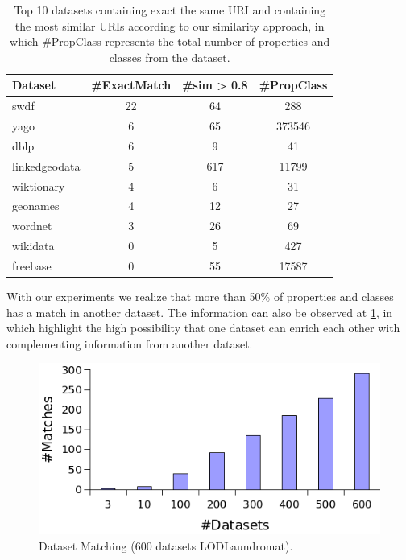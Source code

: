 \documentclass[sw]{iosart2x}
\begin{document}
\begin{table}[htb]
\centering
\begin{tabular}{|l|c|c|c|} \hline
\textbf{Dataset} & \textbf{\#ExactMatch} & \textbf{\#sim > 0.8} & \textbf{\#PropClas}s \\  \hline
swdf & 22 & 64 & 288 \\ \hline
yago & 6 & 65 & 373546 \\ \hline
dblp & 6 & 9 & 41 \\ \hline
linkedgeodata & 5 & 617 & 11799 \\ \hline
wiktionary & 4 & 6 & 31 \\ \hline
geonames & 4 & 12 & 27 \\ \hline
wordnet & 3 & 26 & 69 \\ \hline
wikidata & 0 & 5 & 427 \\ \hline
freebase & 0 & 55 & 17587 \\ \hline
\end{tabular}
\caption{Top 10 datasets containing exact the same URI and containing the most similar URIs according to our similarity approach, in which \#PropClass represents the total number of properties and classes from the dataset. }
\label{tab:top10}
\end{table}



With our experiments we realize that more than 50\% of properties and classes has a match in another dataset. The information can also be observed at \cref{fig:match600Laundromat}, in which highlight the high possibility that one dataset can enrich each other with complementing information from another dataset.


\begin{figure}[htb] 
	\centering
	\includegraphics[width=\linewidth]{img/LaundromatDsMatch.png}
	\caption{Dataset Matching (600 datasets LODLaundromat).}
	\label{fig:match600Laundromat}
\end{figure}
\end{document}
